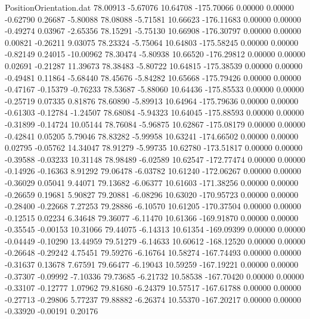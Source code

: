 \begin{filecontents}{PositionOrientation.dat}
  78.00913   -5.67076   10.64708  -175.70066    0.00000    0.00000   -0.62790    0.26687   -5.80088
  78.08088   -5.71581   10.66623  -176.11683    0.00000    0.00000   -0.49274    0.03967   -2.65356
  78.15291   -5.75130   10.66908  -176.30797    0.00000    0.00000    0.00821   -0.26211    9.03075
  78.23324   -5.75064   10.64803  -175.58245    0.00000    0.00000   -0.82149    0.24015  -10.00962
  78.30474   -5.80938   10.66520  -176.29812    0.00000    0.00000    0.02691   -0.21287   11.39673
  78.38483   -5.80722   10.64815  -175.38539    0.00000    0.00000   -0.49481    0.11864   -5.68440
  78.45676   -5.84282   10.65668  -175.79426    0.00000    0.00000   -0.47167   -0.15379   -0.76233
  78.53687   -5.88060   10.64436  -175.85533    0.00000    0.00000   -0.25719    0.07335    0.81876
  78.60890   -5.89913   10.64964  -175.79636    0.00000    0.00000   -0.61303   -0.12784   -1.24507
  78.68084   -5.94323   10.64045  -175.88593    0.00000    0.00000   -0.31899   -0.14724   10.05144
  78.76084   -5.96875   10.62867  -175.08179    0.00000    0.00000   -0.42841    0.05205    5.79046
  78.83282   -5.99958   10.63241  -174.66502    0.00000    0.00000    0.02795   -0.05762   14.34047
  78.91279   -5.99735   10.62780  -173.51817    0.00000    0.00000   -0.39588   -0.03233   10.31148
  78.98489   -6.02589   10.62547  -172.77474    0.00000    0.00000   -0.14926   -0.16363    8.91292
  79.06478   -6.03782   10.61240  -172.06267    0.00000    0.00000   -0.36029    0.05041    9.44071
  79.13682   -6.06377   10.61603  -171.38256    0.00000    0.00000   -0.26659    0.19681    5.90827
  79.20881   -6.08296   10.63020  -170.95723    0.00000    0.00000   -0.28400   -0.22668    7.27253
  79.28886   -6.10570   10.61205  -170.37504    0.00000    0.00000   -0.12515    0.02234    6.34648
  79.36077   -6.11470   10.61366  -169.91870    0.00000    0.00000   -0.35545   -0.00153   10.31066
  79.44075   -6.14313   10.61354  -169.09399    0.00000    0.00000   -0.04449   -0.10290   13.44959
  79.51279   -6.14633   10.60612  -168.12520    0.00000    0.00000   -0.26648   -0.29242    4.75451
  79.59276   -6.16764   10.58274  -167.74493    0.00000    0.00000   -0.31637    0.13678    7.67591
  79.66477   -6.19043   10.59259  -167.19221    0.00000    0.00000   -0.37307   -0.09992   -7.10336
  79.73685   -6.21732   10.58538  -167.70420    0.00000    0.00000   -0.33107   -0.12777    1.07962
  79.81680   -6.24379   10.57517  -167.61788    0.00000    0.00000   -0.27713   -0.29806    5.77237
  79.88882   -6.26374   10.55370  -167.20217    0.00000    0.00000   -0.33920   -0.00191    0.20176

\end{filecontents}

